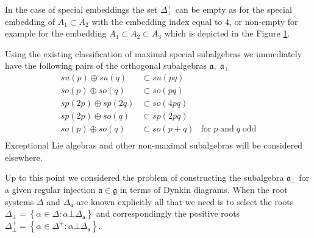 \documentclass[a4paper,12pt]{article}
\theoremstyle{definition} \newtheorem{Def}{Definition}
\begin{document}
In the case of special embeddings the set $\Delta^{+}_{\bot}$ can be empty as for the
special embedding of $A_1\subset A_2$ with the embedding index equal to 4, or non-empty for example for the embedding $A_1\subset A_2\subset A_3$ which is depicted in the Figure \ref{fig:a1a2a3}. 
\begin{figure}[h]
\noindent  {}
  \label{fig:a1a2a3}
\end{figure}

Using the existing classification of maximal special subalgebras \cite{dynkin1952semisimple} we immediately have the following pairs of the orthogonal subalgebras $\mathfrak{a},\;\mathfrak{a}_{\bot}$
\begin{equation}
  \label{eq:42}
  \begin{array}{lll}
      su(p)\oplus su(q) & \subset su(pq) &\\
      so(p)\oplus so(q) & \subset so(pq) &\\
      sp(2p)\oplus sp(2q) & \subset so(4pq)&\\
      sp(2p)\oplus so(q) & \subset sp(2pq)&\\
      so(p)\oplus so(q) & \subset so(p+q)& \text{for}\;p\;\text{and}\;q\;\text{odd}\\
  \end{array}
\end{equation}
Exceptional Lie algebras and other non-maximal subalgebras will be considered elsewhere.

Up to this point we considered the problem of constructing the subalgebra $\mathfrak{a}_{\bot}$ for a given regular injection $\mathfrak{a}\in\mathfrak{g}$  in terms of Dynkin diagrams. When the root systems $ \Delta$ and $\Delta_{\mathfrak{a}}$ are known explicitly all that we need is to select the roots
$\Delta_{\bot}=\left\{\alpha\in \Delta:\alpha\bot \Delta_{\mathfrak{a}}\right\}$ and correspondingly the positive roots
$\Delta^{+}_{\bot}=\left\{\alpha\in \Delta^{+}:\alpha\bot \Delta_{\mathfrak{a}}\right\}$. 
\end{document}
